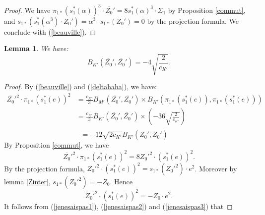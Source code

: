 \documentclass{alggeom}
\theoremstyle{plain}
\newtheorem{lemme}[theorem]{Lemma}
\theoremstyle{definition}
\theoremstyle{remark}
\begin{document}
\begin{proof}
We have $\pi_{1*}(s_{1}^{*}(\alpha))^{3}\cdot\overline{Z_0}'=8s_{1}^{*}(\alpha)^{3}\cdot\Sigma_{1}$ by Proposition \ref{commut},
and $s_{1*}(s_{1}^{*}(\alpha^{3})\cdot Z_0')=\alpha^{3}\cdot s_{1*}(Z_0')=0$ by the projection formula.
We conclude with (\ref{beauville}).
\end{proof}
\begin{lemme}\label{Z2}
We have:
$$B_{K'}(\overline{Z_0}',\overline{Z_0}')=-4\sqrt{\frac{2}{c_{K'}}}.$$
\end{lemme}
\begin{proof}
By (\ref{beauville}) and (\ref{deltahaha}), we have:
\begin{align*}
\overline{Z_0}'^{2}\cdot\pi_{1*}(s_{1}^{*}(e))^{2}
&=\frac{c_{K'}}{3}B_{M'}(\overline{Z_0}',\overline{Z_0}')\times B_{K'}(\pi_{1*}(s_{1}^{*}(e)),\pi_{1*}(s_{1}^{*}(e)))\\
&=\frac{c_{K'}}{3}B_{K'}(\overline{Z_0}',\overline{Z_0}')\times\left(-36\sqrt{\frac{2}{c_{K'}}}\right)\\
\end{align*}
\vspace{-1cm}
\begin{equation}
=-12\sqrt{2c_{K'}}B_{K'}(\overline{Z_0}',\overline{Z_0}')\ \ \ \ \ \ 
\label{jenesaispas1}
\end{equation}
By Proposition \ref{commut}, we have 
\begin{equation}
\overline{Z_0}'^{2}\cdot\pi_{1*}(s_{1}^{*}(e))^{2}=8Z_0'^{2}\cdot (s_{1}^{*}(e))^{2}.
\label{jenesaispas2}
\end{equation}
By the projection formula, 
$Z_0'^{2}\cdot (s_{1}^{*}(e))^{2}=s_{1*}(Z_0'^{2})\cdot e^{2}$.
Moreover by lemma \ref{Zinter}, $s_{1*}(Z_0'^{2})=-Z_0$. 
Hence
\begin{equation}
Z_0'^{2}\cdot (s_{1}^{*}(e))^{2}=-Z_0\cdot e^{2}.
\label{jenesaispas3}
\end{equation}
It follows from (\ref{jenesaispas1}), (\ref{jenesaispas2}) and (\ref{jenesaispas3}) that

\end{proof}
\end{document}
